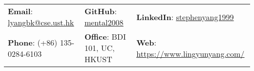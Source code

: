 \documentclass[letterpaper, 12pt]{article}
\begin{document}


\setlength{\tabcolsep}{10pt}


\vspace{0.5cm}
\begin{center}
\begin{tabular}{lll}
\textbf{Email}: \href{mailto:lyangbk@cse.ust.hk}{\underline{lyangbk@cse.ust.hk}} &
\hspace{0.25in} \textbf{GitHub}: \href{https://github.com/mental2008}{\underline{mental2008}} &
\hspace{0.25in} \textbf{LinkedIn}: \href{https://www.linkedin.com/in/stephenyang1999/}{\underline{stephenyang1999}} \\

\textbf{Phone}: (+86) 135-0284-6103 &
\hspace{0.25in} \textbf{Office}: BDI 101, UC, HKUST &
\hspace{0.25in} \textbf{Web}: \href{https://www.lingyunyang.com/}{\underline{https://www.lingyunyang.com/}} \\
\end{tabular}
\end{center}
\end{document}
